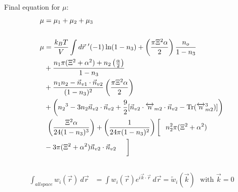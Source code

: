 \documentclass[double,12pt]{revtex4-2}
\begin{document}
Final equation for $\mu$:  
\begin{align}
   \mu &=   \mu_1 + \mu_2 + \mu_3  \\ \nonumber \\
%
   \mu &=\frac{k_BT}{V}\int d\vec r~' (-1)\ln(1-n_3)+\left(
        \frac{\pi\Xi^2\alpha}{2}\right)\frac{n_o}
        {1-n_3} \\
    &+ \frac{n_1\pi(\Xi^2 + \alpha^2)
       +n_2\left(\frac{\alpha}{2}\right)}{1-n_3} \\
       &+ \frac{n_1n_2-\vec n_{v1}
         \cdot \vec n_{v2}}{(1-n_3)^2}
          \left(\frac{\pi\Xi^2\alpha}{2}\right) \\
   &+\left({n_2}^3-3n_2
   \vec{n}_{v2}\cdot\vec{n}_{v2} 
    +\frac{9}{2}[\vec{n}_{v2}\cdot{\overleftrightarrow{n}_{m2}}\cdot{
    \vec{n}_{v2}}-\operatorname{Tr}({\overleftrightarrow{n}^3_{m2}})]
    \right) \\
    &~\left(\frac{\Xi^2\alpha}{24(1-n_3)^3}
    \right) + \left(\frac{1}{24\pi(1-n_3)^2}\right)\left[\color{white}
    \frac{1}{1}\color{black}n_2^2
    \pi(\Xi^2 + \alpha^2) \color{white}\right] \\
    &- 3\pi(\Xi^2 + \alpha^2)\vec n_{v2} \cdot \vec n_{v2}
    \color{white}\left[\frac{1}{1}\color{black}\right]
\end{align}

\[\]
\[\]
\[\]
\[\]
\[\]
\[\]


\begin{align}
   \int_{all space} w_i(\vec r) ~d\vec r &= \int w_i(\vec r)e^{i\vec k \cdot 
   \vec r}~d\vec r 
    = \widetilde{w}_i(\vec k) \mbox{~~with $\vec k = 0$}
\end{align}
\end{document}
